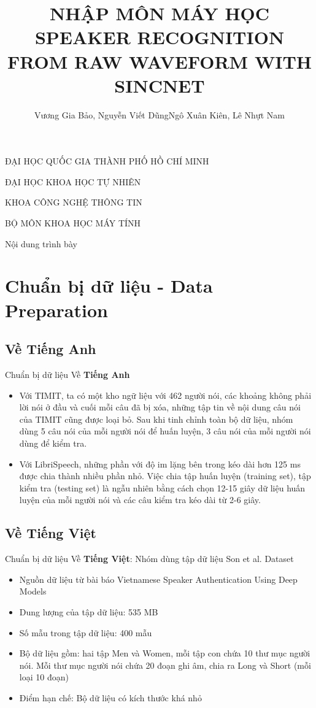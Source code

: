 \documentclass[notheorems, aspectratio=54]{beamer}
\author{Vương Gia Bảo, Nguyễn Viết Dũng\newline Ngô Xuân Kiên, Lê Nhựt Nam}
\title{NHẬP MÔN MÁY HỌC \newline SPEAKER RECOGNITION FROM \newline RAW WAVEFORM WITH SINCNET}
\begin{document}
\begin{frame}
	\centering
	ĐẠI HỌC QUỐC GIA THÀNH PHỐ HỒ CHÍ MINH
	
	ĐẠI HỌC KHOA HỌC TỰ NHIÊN
	
	KHOA CÔNG NGHỆ THÔNG TIN
	
	BỘ MÔN KHOA HỌC MÁY TÍNH
	\titlepage
\end{frame}

\begin{frame}{Nội dung trình bày}
\tableofcontents
\end{frame}
\section{Chuẩn bị dữ liệu - Data Preparation}
\subsection{Về \textbf{Tiếng Anh}}
\begin{frame}{Chuẩn bị dữ liệu}
	Về \textbf{Tiếng Anh}
	\begin{itemize}
		\item Với TIMIT, ta có một kho ngữ liệu với 462 người nói, các khoảng không phải lời nói ở đầu và cuối mỗi câu đã bị xóa, những tập tin về nội dung câu nói của TIMIT cũng được loại bỏ. Sau khi tinh chỉnh toàn bộ dữ liệu, nhóm dùng 5 câu nói của mỗi người nói để huấn luyện, 3 câu nói của mỗi người nói dùng để kiểm tra.
		\item Với LibriSpeech, những phần với độ im lặng bên trong kéo dài hơn 125 ms được
		chia thành nhiều phần nhỏ. Việc chia tập huấn luyện (training set), tập kiểm tra (testing set) là ngẫu nhiên bằng cách chọn 12-15 giây dữ liệu huấn luyện của mỗi người nói và các câu kiểm tra kéo dài từ 2-6 giây.
	\end{itemize}
\end{frame}
\subsection{Về \textbf{Tiếng Việt}}
\begin{frame}{Chuẩn bị dữ liệu}
	Về \textbf{Tiếng Việt}: Nhóm dùng tập dữ liệu Son et al. Dataset
	\begin{itemize}
		\item Nguồn dữ liệu từ bài báo Vietnamese Speaker Authentication Using Deep Models
		\item Dung lượng của tập dữ liệu: 535 MB
		\item Số mẫu trong tập dữ liệu: 400 mẫu
		\item Bộ dữ liệu gồm: hai tập Men và Women, mỗi tập con chứa 10 thư mục người nói. Mỗi thư mục người nói chứa 20 đoạn ghi âm, chia ra Long và Short (mỗi loại 10 đoạn)
		\item Điểm hạn chế: Bộ dữ liệu có kích thước khá nhỏ
	\end{itemize}
\end{frame}
\end{document}
